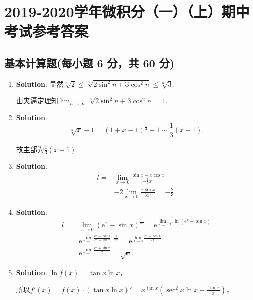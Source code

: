 \documentclass[../Main.tex]{subfiles}
\begin{document}
\chapter{2019-2020学年微积分（一）（上）期中考试参考答案}
\section{基本计算题(每小题 6 分，共 60 分)}
\begin{enumerate}
    \item \textbf{Solution}. 显然$\sqrt[n]{2}\leq\sqrt[n]{2\sin^{2} n+3\cos^{2}
                  n}\leq\sqrt[n]{3}$.

          由夹逼定理知$\lim_{n\to\infty}\sqrt[n]{2\sin^{2} n+3\cos^{2} n}=1$.

    \item \textbf{Solution}.
          \[
              \sqrt[3]{x}-1=(1+x-1)^{\frac{1}{3}}-1\sim\frac{1}{3}(x-1).
          \]

          故主部为$\frac{1}{3}(x-1)$.

    \item \textbf{Solution}.
          \[
              \begin{aligned}
                  l= & \lim_{x\to0}\frac{\sin x-x\cos x}{-\frac{1}{2}x^3} \\
                  =  & -2\lim_{x\to0}\frac{x\sin x}{3x^2}=-\frac{2}{3}.
              \end{aligned}
          \]

    \item \textbf{Solution}.
          \[
              \begin{aligned}
                  l= & \lim_{x\to0}\left(\mathrm{e}^{x}-\sin x\right)^{\frac{1}{x^2}}=\mathrm{e}^{\lim\limits_{x\to0} \frac{1}{x^2}\ln\left(\mathrm{e}^x-\sin x\right)}                 \\
                  =  & \mathrm{e}^{\lim\limits_{x\to0}\frac{\mathrm{e}^x-\cos x}{\mathrm{e}^x-\sin x}\cdot\frac{1}{2x}}= \mathrm{e}^{\lim\limits_{x\to0}\frac{\mathrm{e}^x-\cos x}{2x}} \\
                  =  & \mathrm{e}^{\lim\limits_{x\to0}\frac{\mathrm{e}^x+\sin x}{2}}=\sqrt{\mathrm{e}}.
              \end{aligned}
          \]

    \item \textbf{Solution}. $\ln f(x)=\tan x\ln x$，

          所以$f'(x)=f(x)\cdot\left(\tan x\ln x\right)'=x^{\tan x}\left(\sec^{2} x \ln
              x + \frac{\tan x}{x}\right)$，


\end{enumerate}
\end{document}
